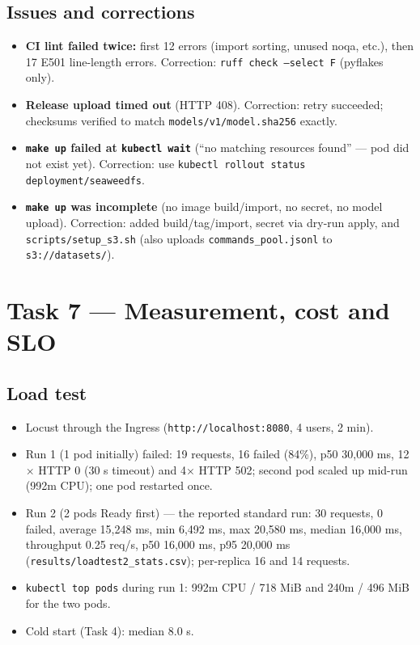 \documentclass[11pt,a4paper]{article}
\begin{document}
\subsection*{Issues and corrections}
\begin{itemize}
\item \textbf{CI lint failed twice:} first 12 errors (import sorting, unused noqa, etc.), then 17 E501 line-length errors. Correction: \texttt{ruff check --select F} (pyflakes only).
\item \textbf{Release upload timed out} (HTTP 408). Correction: retry succeeded; checksums verified to match \texttt{models/v1/model.sha256} exactly.
\item \textbf{\texttt{make up} failed at \texttt{kubectl wait}} (``no matching resources found'' --- pod did not exist yet). Correction: use \texttt{kubectl rollout status deployment/seaweedfs}.
\item \textbf{\texttt{make up} was incomplete} (no image build/import, no secret, no model upload). Correction: added build/tag/import, secret via dry-run apply, and \texttt{scripts/setup\_s3.sh} (also uploads \texttt{commands\_pool.jsonl} to \texttt{s3://datasets/}).
\end{itemize}

\section{Task 7 --- Measurement, cost and SLO}
\subsection*{Load test}
\begin{itemize}
\item Locust through the Ingress (\texttt{http://localhost:8080}, 4 users, 2 min).
\item Run 1 (1 pod initially) failed: 19 requests, 16 failed (84\%), p50 30,000 ms, 12$\times$ HTTP 0 (30 s timeout) and 4$\times$ HTTP 502; second pod scaled up mid-run (992m CPU); one pod restarted once.
\item Run 2 (2 pods Ready first) --- the reported standard run: 30 requests, 0 failed, average 15,248 ms, min 6,492 ms, max 20,580 ms, median 16,000 ms, throughput 0.25 req/s, p50 16,000 ms, p95 20,000 ms (\texttt{results/loadtest2\_stats.csv}); per-replica 16 and 14 requests.
\item \texttt{kubectl top pods} during run 1: 992m CPU / 718 MiB and 240m / 496 MiB for the two pods.
\item Cold start (Task 4): median 8.0 s.
\end{itemize}
\end{document}
